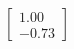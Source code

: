 \documentclass[preview]{standalone}
\begin{document}
\begin{align*}
\begin{bmatrix} 1.00 \\ -0.73 \end{bmatrix}
\end{align*}
\end{document}
